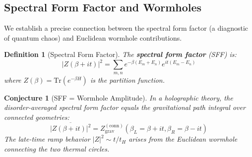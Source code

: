 \documentclass[12pt,a4paper]{article}
\newtheorem{conjecture}[theorem]{Conjecture}
\newtheorem{definition}[theorem]{Definition}
\begin{document}
\subsection{Spectral Form Factor and Wormholes}

We establish a precise connection between the spectral form factor (a diagnostic of quantum chaos) and Euclidean wormhole contributions.

\begin{definition}[Spectral Form Factor]
The \textbf{spectral form factor} (SFF) is:
\begin{equation}
|Z(\beta + it)|^2 = \sum_{m,n} e^{-\beta(E_m + E_n)} e^{it(E_m - E_n)}
\end{equation}
where $Z(\beta) = \text{Tr}(e^{-\beta H})$ is the partition function.
\end{definition}

\begin{conjecture}[SFF = Wormhole Amplitude]
In a holographic theory, the disorder-averaged spectral form factor equals the gravitational path integral over connected geometries:
\begin{equation}
\overline{|Z(\beta + it)|^2} = Z_{\text{grav}}^{(\text{conn})}(\beta_L = \beta + it, \beta_R = \beta - it)
\end{equation}
The late-time ramp behavior $|Z|^2 \sim t/t_H$ arises from the Euclidean wormhole connecting the two thermal circles.
\end{conjecture}
\end{document}
